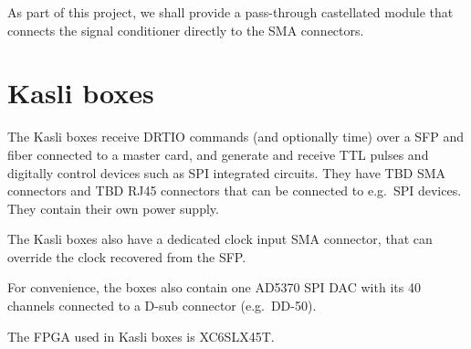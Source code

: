 \documentclass[11pt]{paper}
\begin{document}
As part of this project, we shall provide a pass-through castellated module that connects the signal conditioner directly to the SMA connectors.

\section{Kasli boxes}
The Kasli boxes receive DRTIO commands (and optionally time) over a SFP and fiber connected to a master card, and generate and receive TTL pulses and digitally control devices such as SPI integrated circuits. They have TBD SMA connectors and TBD RJ45 connectors that can be connected to e.g.\ SPI devices. They contain their own power supply.

The Kasli boxes also have a dedicated clock input SMA connector, that can override the clock recovered from the SFP.

For convenience, the boxes also contain one AD5370 SPI DAC with its 40 channels connected to a D-sub connector (e.g.\ DD-50).

The FPGA used in Kasli boxes is XC6SLX45T.
\end{document}
